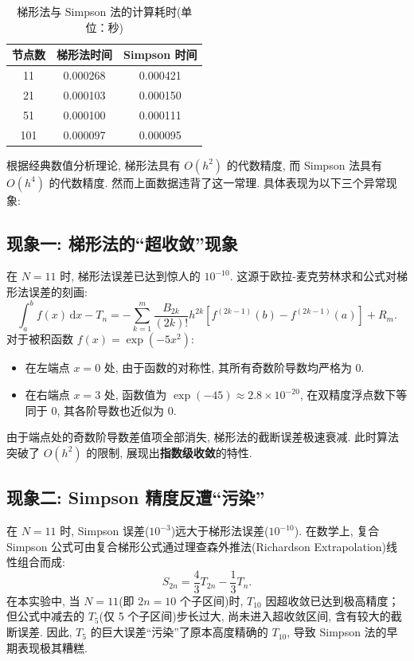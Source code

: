 \documentclass[12pt,a4paper]{ctexart}
\begin{document}
\begin{table}[H]
\centering
\caption{梯形法与 Simpson 法的计算耗时(单位：秒)}
\label{tab:time}
\small
\begin{tabular}{ccc}
\hline
节点数 & 梯形法时间 & Simpson 时间 \\
\hline
11  & 0.000268 & 0.000421 \\
21  & 0.000103 & 0.000150 \\
51  & 0.000100 & 0.000111 \\
101 & 0.000097 & 0.000095 \\
\hline
\end{tabular}
\end{table}

根据经典数值分析理论, 梯形法具有 $O(h^2)$ 的代数精度, 而 Simpson 法具有 $O(h^4)$ 的代数精度. 然而上面数据违背了这一常理. 具体表现为以下三个异常现象: 
\subsection*{现象一: 梯形法的“超收敛”现象}
在 $N=11$ 时, 梯形法误差已达到惊人的 $10^{-10}$. 这源于欧拉-麦克劳林求和公式对梯形法误差的刻画: 
\begin{equation}
    \int_{a}^{b} f(x) \,\mathrm{d} x - T_n = -\sum_{k=1}^{m} \frac{B_{2k}}{(2k)!} h^{2k} \left[ f^{(2k-1)}(b) - f^{(2k-1)}(a) \right] + R_m.
\end{equation}
对于被积函数 $f(x) = \exp(-5x^2)$: 
\begin{itemize}
    \item 在左端点 $x=0$ 处, 由于函数的对称性, 其所有奇数阶导数均严格为 0. 
    \item 在右端点 $x=3$ 处, 函数值为 $\exp(-45) \approx 2.8 \times 10^{-20}$, 在双精度浮点数下等同于 0, 其各阶导数也近似为 0. 
\end{itemize}
由于端点处的奇数阶导数差值项全部消失, 梯形法的截断误差极速衰减. 此时算法突破了 $O(h^2)$ 的限制, 展现出\textbf{指数级收敛}的特性. 

\subsection*{现象二: Simpson 精度反遭“污染”}
在 $N=11$ 时, Simpson 误差($10^{-3}$)远大于梯形法误差($10^{-10}$). 在数学上, 复合 Simpson 公式可由复合梯形公式通过理查森外推法(Richardson Extrapolation)线性组合而成: 
\begin{equation}
    S_{2n} = \frac{4}{3}T_{2n} - \frac{1}{3}T_n.
\end{equation}
在本实验中, 当 $N=11$(即 $2n=10$ 个子区间)时, $T_{10}$ 因超收敛已达到极高精度；但公式中减去的 $T_5$(仅 5 个子区间)步长过大, 尚未进入超收敛区间, 含有较大的截断误差. 因此, $T_5$ 的巨大误差“污染”了原本高度精确的 $T_{10}$, 导致 Simpson 法的早期表现极其糟糕. 
\end{document}
